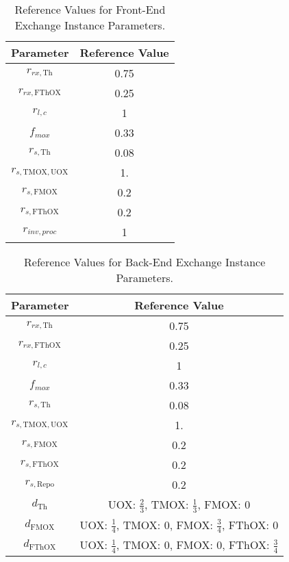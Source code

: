 \begin{table}[h!]
\centering
\caption{Reference Values for Front-End Exchange Instance Parameters.}
\label{tbl:front_ref_params}
\begin{tabular}{|c|c|}
\hline
Parameter    & Reference Value
\\ \hline
$r_{rx, \text{Th}}$   & 0.75 
\\ \hline
$r_{rx, \text{FThOX}}$ & 0.25
\\ \hline
$r_{l, c}$ & 1
\\ \hline
$f_{mox}$     & 0.33
\\ \hline
$r_{s, \text{Th}}$ & 0.08
\\ \hline
$r_{s, \text{TMOX}, \text{UOX}}$ & 1.
\\ \hline
$r_{s, \text{FMOX}}$ & 0.2
\\ \hline
$r_{s, \text{FThOX}}$ & 0.2
\\ \hline
$r_{inv, proc}$   & 1
\\ \hline
\end{tabular}
\end{table}

\begin{table}[h!]
\centering
\caption{Reference Values for Back-End Exchange Instance Parameters.}
\label{tbl:back_ref_params}
\begin{tabular}{|c|c|}
\hline
Parameter    & Reference Value
\\ \hline
$r_{rx, \text{Th}}$   & 0.75 
\\ \hline
$r_{rx, \text{FThOX}}$ & 0.25
\\ \hline
$r_{l, c}$ & 1
\\ \hline
$f_{mox}$     & 0.33
\\ \hline
$r_{s, \text{Th}}$ & 0.08
\\ \hline
$r_{s, \text{TMOX}, \text{UOX}}$ & 1.
\\ \hline
$r_{s, \text{FMOX}}$ & 0.2
\\ \hline
$r_{s, \text{FThOX}}$ & 0.2
\\ \hline
$r_{s, \text{Repo}}$   & 0.2
\\ \hline
$d_{\text{Th}}$   & {UOX: $\frac{2}{3}$, TMOX: $\frac{1}{3}$, FMOX: 0}
\\ \hline
$d_{\text{FMOX}}$   & {UOX: $\frac{1}{4}$, TMOX: 0, FMOX: $\frac{3}{4}$, FThOX: 0}
\\ \hline
$d_{\text{FThOX}}$   & {UOX: $\frac{1}{4}$, TMOX: 0, FMOX: 0, FThOX: $\frac{3}{4}$}
\\ \hline
\end{tabular}
\end{table}

